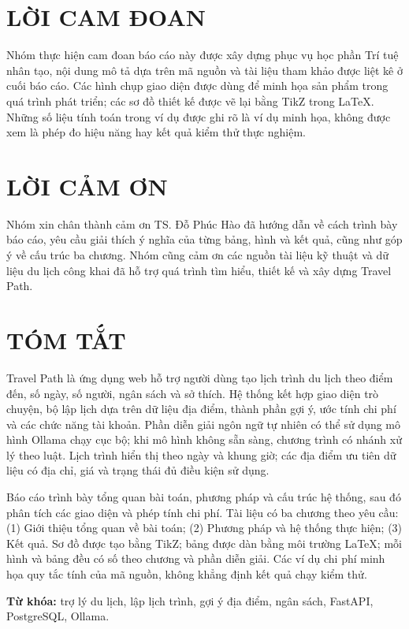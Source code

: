 \documentclass[12pt,a4paper,oneside]{report}
\begin{document}
\chapter*{LỜI CAM ĐOAN}
Nhóm thực hiện cam đoan báo cáo này được xây dựng phục vụ học phần Trí tuệ nhân tạo, nội dung mô tả dựa trên mã nguồn và tài liệu tham khảo được liệt kê ở cuối báo cáo. Các hình chụp giao diện được dùng để minh họa sản phẩm trong quá trình phát triển; các sơ đồ thiết kế được vẽ lại bằng TikZ trong LaTeX. Những số liệu tính toán trong ví dụ được ghi rõ là ví dụ minh họa, không được xem là phép đo hiệu năng hay kết quả kiểm thử thực nghiệm.

\chapter*{LỜI CẢM ƠN}
Nhóm xin chân thành cảm ơn TS. Đỗ Phúc Hào đã hướng dẫn về cách trình bày báo cáo, yêu cầu giải thích ý nghĩa của từng bảng, hình và kết quả, cũng như góp ý về cấu trúc ba chương. Nhóm cũng cảm ơn các nguồn tài liệu kỹ thuật và dữ liệu du lịch công khai đã hỗ trợ quá trình tìm hiểu, thiết kế và xây dựng Travel Path.

\chapter*{TÓM TẮT}
Travel Path là ứng dụng web hỗ trợ người dùng tạo lịch trình du lịch theo điểm đến, số ngày, số người, ngân sách và sở thích. Hệ thống kết hợp giao diện trò chuyện, bộ lập lịch dựa trên dữ liệu địa điểm, thành phần gợi ý, ước tính chi phí và các chức năng tài khoản. Phần diễn giải ngôn ngữ tự nhiên có thể sử dụng mô hình Ollama chạy cục bộ; khi mô hình không sẵn sàng, chương trình có nhánh xử lý theo luật. Lịch trình hiển thị theo ngày và khung giờ; các địa điểm ưu tiên dữ liệu có địa chỉ, giá và trạng thái đủ điều kiện sử dụng.

Báo cáo trình bày tổng quan bài toán, phương pháp và cấu trúc hệ thống, sau đó phân tích các giao diện và phép tính chi phí. Tài liệu có ba chương theo yêu cầu: (1) Giới thiệu tổng quan về bài toán; (2) Phương pháp và hệ thống thực hiện; (3) Kết quả. Sơ đồ được tạo bằng TikZ; bảng được dàn bằng môi trường LaTeX; mỗi hình và bảng đều có số theo chương và phần diễn giải. Các ví dụ chi phí minh họa quy tắc tính của mã nguồn, không khẳng định kết quả chạy kiểm thử.

\vspace{0.5cm}
\noindent\textbf{Từ khóa:} trợ lý du lịch, lập lịch trình, gợi ý địa điểm, ngân sách, FastAPI, PostgreSQL, Ollama.
\end{document}
